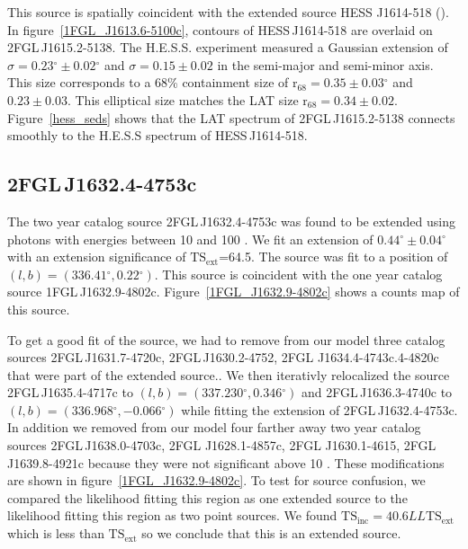 \documentclass[12pt,preprint]{aastex}
\newcommand{\gev}{\text{GeV}\xspace}
\newcommand{\tev}{\text{TeV}\xspace}
\newcommand{\tsext}{{\ensuremath{\text{TS}_\text{ext}}}\xspace}
\newcommand{\tsinc}{\ensuremath{\text{TS}_\text{inc}}\xspace}
\newcommand{\loglikelihood}{\ensuremath{LL}\xspace}
\newcommand{\rsixeight}{{\ensuremath{\text{r}_{68}}}\xspace}
\renewcommand{\deg}{\ensuremath{^\circ}\xspace}
\begin{document}
This source is spatially coincident with the extended \tev source HESS
J1614-518 (\cite{hess_plane_survey}). In figure~\ref{1FGL_J1613.6-5100c},
contours of HESS\,J1614-518 are overlaid on 2FGL\,J1615.2-5138.
The H.E.S.S. experiment measured a Gaussian extension of
$\sigma=0.23\deg\pm0.02\deg$ and $\sigma=0.15\pm0.02$ in the semi-major
and semi-minor axis. This size corresponds to a 68\% containment size
of $\rsixeight=0.35\pm0.03\deg$ and $0.23\pm0.03$.  This elliptical size
matches the LAT size $\rsixeight=0.34\pm0.02$.
Figure~\ref{hess_seds} shows that the LAT spectrum of
2FGL\,J1615.2-5138 connects smoothly to the 
H.E.S.S spectrum of HESS\,J1614-518.




\subsection{2FGL\,J1632.4-4753c}
\label{section_2FGL_J1632.4-4753c}



The two year catalog source 2FGL\,J1632.4-4753c was found to be
extended using photons with energies between 10 \gev and 100 \gev.
We fit an extension of $0.44\deg\pm0.04\deg$ with an extension
significance of \tsext=64.5.  The source was fit to a position of
$(l,b)=(336.41\deg,0.22\deg)$.  This source is coincident with the one
year catalog source 1FGL\,J1632.9-4802c.  Figure~\ref{1FGL_J1632.9-4802c}
shows a counts map of this source.

To get a good fit of the source, we had to remove from our model
three catalog sources 2FGL\,J1631.7-4720c, 2FGL\,J1630.2-4752,
2FGL J1634.4-4743c.4-4820c that were part of the extended source..
We then iterativly relocalized the source 2FGL\,J1635.4-4717c
to $(l,b)=(337.230\deg,0.346\deg)$ and 2FGL\,J1636.3-4740c to
$(l,b)=(336.968\deg,-0.066\deg)$ while fitting the extension of
2FGL\,J1632.4-4753c.  In addition we removed from our model four
farther away two year catalog sources 2FGL\,J1638.0-4703c, 2FGL
J1628.1-4857c, 2FGL  J1630.1-4615, 2FGL\,J1639.8-4921c because they
were not significant above 10 \gev.  These modifications are shown
in figure~\ref{1FGL_J1632.9-4802c}.  To test for source confusion,
we compared the likelihood fitting this region as one extended source
to the likelihood fitting this region as two point sources. We found
$\tsinc=40.6\loglikelihood\tsext$ which is less than \tsext so we conclude
that this is an extended source.
\end{document}
